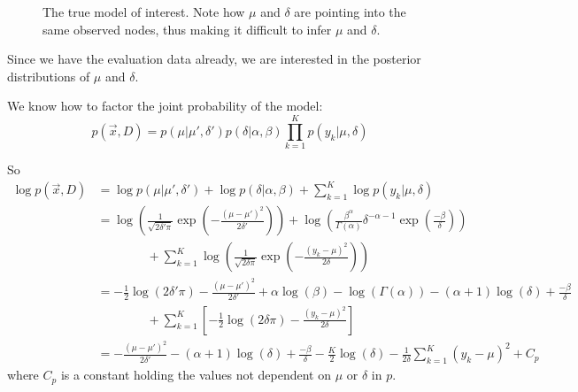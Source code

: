\documentclass[12pt]{article}
\begin{document}
\begin{figure}[h]
    \centering
{}
    \caption{The true model of interest.  Note how $\mu$ and $\delta$ are
    pointing into the same observed nodes, thus making it difficult to infer
    $\mu$ and $\delta$.}
    \label{fig:pmodel}
\end{figure}

Since we have the evaluation data already, we are interested in the posterior
distributions of $\mu$ and $\delta$.

We know how to factor the joint probability of the model:
\begin{equation}
    p(\vec{x}, D) = p(\mu|\mu', \delta')p(\delta|\alpha, \beta)\prod_{k=1}^{K}p(y_{k}|\mu, \delta)
\end{equation}

So
\begin{align}
    \log{p(\vec{x}, D)} &= \log{p(\mu|\mu', \delta')} + \log{p(\delta|\alpha,
    \beta)} + \sum_{k=1}^{K}
    \log{p(y_{k}|\mu, \delta)} \nonumber \\
    &=
    \log{\left(\frac{1}{\sqrt{2\delta'\pi}}\exp{\left(-\frac{(\mu-\mu')^{2}}{2\delta'}\right)}\right)} +
    \log{\left(\frac{\beta^{\alpha}}{\Gamma(\alpha)}\delta^{-\alpha-1}\exp{\left(\frac{-\beta}{\delta}\right)}\right)}
    \nonumber \\
    &\quad\quad\quad\quad+ \sum_{k=1}^{K}
    \log{\left(\frac{1}{\sqrt{2\delta\pi}}\exp{\left(-\frac{(y_{k}-\mu)^{2}}{2\delta}\right)}\right)}
    \nonumber \\
    &= -\frac{1}{2} \log{(2\delta'\pi)} - \frac{(\mu - \mu')^{2}}{2\delta'} +
    \alpha \log{(\beta)} - \log{(\Gamma(\alpha))} - (\alpha + 1) \log{(\delta)}
    + \frac{-\beta}{\delta}\nonumber \\
    &\quad\quad\quad\quad+ \sum_{k=1}^{K} \left[-\frac{1}{2}
    \log{(2\delta\pi)} - \frac{(y_{k} - \mu)^{2}}{2\delta}\right] \nonumber \\
    &= -\frac{(\mu-\mu')^{2}}{2\delta'} - (\alpha+1)\log{(\delta)} +
    \frac{-\beta}{\delta} - \frac{K}{2}\log{(\delta)} -
    \frac{1}{2\delta}\sum_{k=1}^{K} (y_{k}-\mu)^{2} + C_p
    \label{eq:logp}
\end{align}
where $C_p$ is a constant holding the values not dependent on $\mu$ or $\delta$
in $p$.
\end{document}
